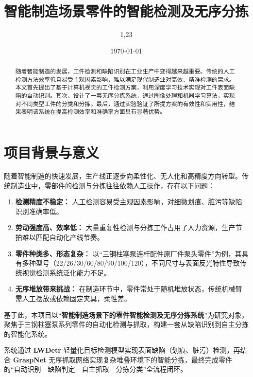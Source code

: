 \documentclass{cumcmthesis}
\title{智能制造场景零件的智能检测及无序分拣}
\date{\today}
\author{1,23}
\begin{document}
\maketitle
\newpage
\begin{abstract}
随着智能制造的发展，工件检测和缺陷识别在工业生产中变得越来越重要。传统的人工检测方法效率低且易受主观因素影响，难以满足现代制造业对高效、精准检测的需求。
本文首先提出了基于计算机视觉的工件检测方案，利用深度学习技术实现对工件表面缺陷的自动识别。其次，设计了一套无序分拣系统，通过图像处理和机器学习算法，实现对不同类型工件的分类和分拣。最后，通过实验验证了所提方案的有效性和实用性，结果表明该系统在提高检测效率和准确率方面具有显著优势。
\end{abstract}

\section{项目背景与意义}

随着智能制造的快速发展，生产线正逐步向柔性化、无人化和高精度方向转型。传统制造业中，零部件的检测与分拣往往依赖人工操作，存在以下问题：

\begin{enumerate}
    \item \textbf{检测精度不稳定：} 人工检测容易受主观因素影响，对细微划痕、脏污等缺陷识别准确率低。
    \item \textbf{劳动强度高、效率低：} 大量重复性检测与分拣工作占用了人力资源，生产节拍难以匹配自动化产线节奏。
    \item \textbf{零件种类多、形态复杂：} 以“三钢柱塞泵连杆配件原厂件泵头零件”为例，其具有多种型号（22/26/30/60/80/90/100/120），不同尺寸与表面反光特性导致传统视觉检测系统泛化能力不足。
    \item \textbf{无序堆放带来挑战：} 在制造环节中，零件常处于随机堆放状态，传统机械臂需人工摆放或依赖固定夹具，柔性差。
\end{enumerate}

基于此，本项目以“\textbf{智能制造场景下的零件智能检测及无序分拣系统}”为研究对象，聚焦于三钢柱塞泵系列零件的自动化检测与抓取，构建一套从缺陷识别到自主分拣的智能化系统。

系统通过 \textbf{LWDetr} \cite{carion2020detr} 轻量化目标检测模型实现表面缺陷（划痕、脏污）检测，再结合 \textbf{GraspNet} 无序抓取网络实现复杂堆叠环境下的智能分拣，最终完成零件的“自动识别—缺陷判定—自主抓取—分拣分类”全流程闭环。
\end{document}
